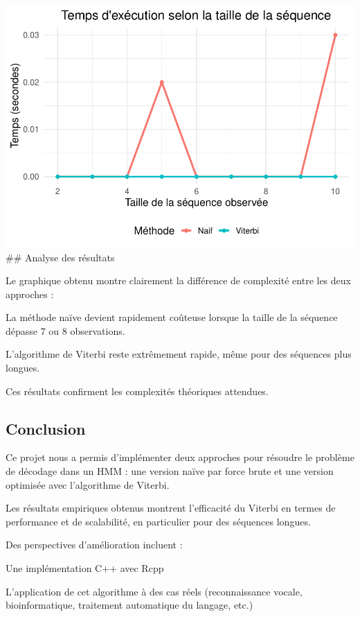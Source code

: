 \documentclass[
]{article}
\begin{document}
\includegraphics{rapport_viterbi_files/figure-latex/unnamed-chunk-4-1.pdf}
\#\# Analyse des résultats

Le graphique obtenu montre clairement la différence de complexité entre
les deux approches :

La méthode naïve devient rapidement coûteuse lorsque la taille de la
séquence dépasse 7 ou 8 observations.

L'algorithme de Viterbi reste extrêmement rapide, même pour des
séquences plus longues.

Ces résultats confirment les complexités théoriques attendues.

\subsection{Conclusion}\label{conclusion}

Ce projet nous a permis d'implémenter deux approches pour résoudre le
problème de décodage dans un HMM : une version naïve par force brute et
une version optimisée avec l'algorithme de Viterbi.

Les résultats empiriques obtenus montrent l'efficacité du Viterbi en
termes de performance et de scalabilité, en particulier pour des
séquences longues.

Des perspectives d'amélioration incluent :

Une implémentation C++ avec Rcpp

L'application de cet algorithme à des cas réels (reconnaissance vocale,
bioinformatique, traitement automatique du langage, etc.)
\end{document}
